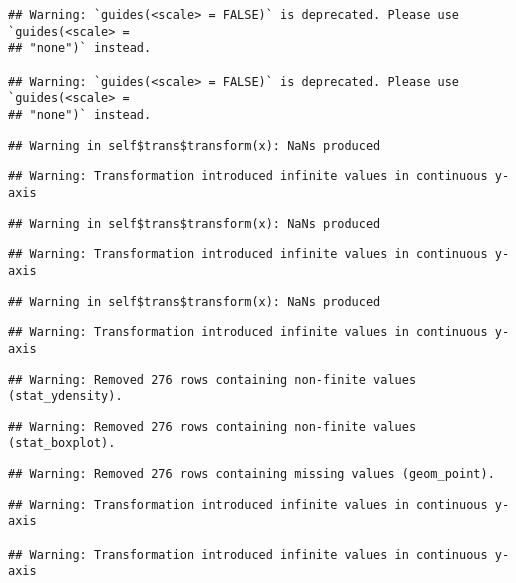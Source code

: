 \documentclass[a4paper,nobind]{templates/ociamthesis}
\begin{document}
\begin{landscape}
\begin{verbatim}
## Warning: `guides(<scale> = FALSE)` is deprecated. Please use `guides(<scale> =
## "none")` instead.

## Warning: `guides(<scale> = FALSE)` is deprecated. Please use `guides(<scale> =
## "none")` instead.
\end{verbatim}

\begin{verbatim}
## Warning in self$trans$transform(x): NaNs produced
\end{verbatim}

\begin{verbatim}
## Warning: Transformation introduced infinite values in continuous y-axis
\end{verbatim}

\begin{verbatim}
## Warning in self$trans$transform(x): NaNs produced
\end{verbatim}

\begin{verbatim}
## Warning: Transformation introduced infinite values in continuous y-axis
\end{verbatim}

\begin{verbatim}
## Warning in self$trans$transform(x): NaNs produced
\end{verbatim}

\begin{verbatim}
## Warning: Transformation introduced infinite values in continuous y-axis
\end{verbatim}

\begin{verbatim}
## Warning: Removed 276 rows containing non-finite values (stat_ydensity).
\end{verbatim}

\begin{verbatim}
## Warning: Removed 276 rows containing non-finite values (stat_boxplot).
\end{verbatim}

\begin{verbatim}
## Warning: Removed 276 rows containing missing values (geom_point).
\end{verbatim}

\begin{verbatim}
## Warning: Transformation introduced infinite values in continuous y-axis

## Warning: Transformation introduced infinite values in continuous y-axis


\end{verbatim}
\end{landscape}
\end{document}
